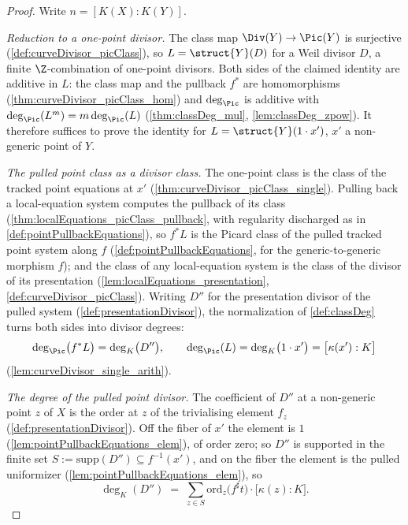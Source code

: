 \begin{proof}
  \leanok
  Write \(n = [K(X) : K(Y)]\).

  \emph{Reduction to a one-point divisor.} The class map
  \(\Div(Y) \to \Pic(Y)\) is surjective (\ref{def:curveDivisor_picClass}), so
  \(L = \struct{Y}(D)\) for a Weil divisor \(D\), a finite \(\Z\)-combination of
  one-point divisors. Both sides of the claimed identity are additive in \(L\): the
  class map and the pullback \(f^{*}\) are homomorphisms
  (\ref{thm:curveDivisor_picClass_hom}) and \(\deg_{\Pic}\) is additive with
  \(\deg_{\Pic}(L^m) = m \deg_{\Pic}(L)\) (\ref{thm:classDeg_mul},
  \ref{lem:classDeg_zpow}). It therefore suffices to prove the identity for
  \(L = \struct{Y}(1 \cdot x')\), \(x'\) a non-generic point of \(Y\).

  \emph{The pulled point class as a divisor class.} The one-point class is the class
  of the tracked point equations at \(x'\) (\ref{thm:curveDivisor_picClass_single}).
  Pulling back a local-equation system computes the pullback of its class
  (\ref{thm:localEquations_picClass_pullback}, with regularity discharged as in
  \ref{def:pointPullbackEquations}), so \(f^{*}L\) is the Picard class of the pulled
  tracked point system along \(f\) (\ref{def:pointPullbackEquations}, for the
  generic-to-generic morphism \(f\)); and the class of any local-equation system is
  the class of the divisor of its presentation
  (\ref{lem:localEquations_presentation}, \ref{def:curveDivisor_picClass}). Writing
  \(D''\) for the presentation divisor of the pulled system
  (\ref{def:presentationDivisor}), the normalization of \ref{def:classDeg} turns both
  sides into divisor degrees:
  \[
    \deg_{\Pic}\bigl(f^{*}L\bigr) = \deg_{K}\bigl(D''\bigr), \qquad
    \deg_{\Pic}(L) = \deg_{K}\bigl(1 \cdot x'\bigr) = \bigl[\kappa(x') : K\bigr]
  \]
  (\ref{lem:curveDivisor_single_arith}).

  \emph{The degree of the pulled point divisor.} The coefficient of \(D''\) at a
  non-generic point \(z\) of \(X\) is the order at \(z\) of the trivialising element
  \(f_z\) (\ref{def:presentationDivisor}). Off the fiber of \(x'\) the element is
  \(1\) (\ref{lem:pointPullbackEquations_elem}), of order zero; so \(D''\) is
  supported in the finite set \(S := \mathrm{supp}(D'') \subseteq f^{-1}(x')\), and on
  the fiber the element is the pulled uniformizer
  (\ref{lem:pointPullbackEquations_elem}), so
  \[
    \deg_{K}(D'') \;=\; \sum_{z \in S}
      \mathrm{ord}_z\bigl(f^{\sharp}t\bigr) \cdot \bigl[\kappa(z) : K\bigr].
  \]


\end{proof}

